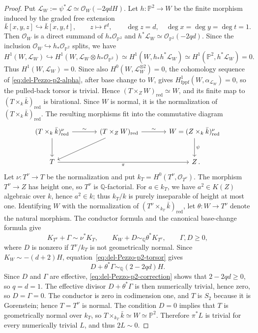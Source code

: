 \documentclass[10pt,abstract=true]{scrartcl}
\numberwithin{equation}{section}
\theoremstyle{definition}
\theoremstyle{remark}
\def\simQ{\sim_{\mathbb Q}} \def\geQ{\ge_{\mathbb Q}}
\begin{document}
\begin{proof}
  Put $\mathscr L_W:=\psi^*\mathscr L\simeq\mathcal O_W(-2qdH)$.
  Let $h\colon\mathbb P^2\to W$ be the finite morphism induced by the graded free extension
  \[
    \bar k[x,y,z]\hookrightarrow\bar k[x,y,t],\qquad
    z\longmapsto t^d,\qquad \deg z=d,\quad\deg x=\deg y=\deg t=1.
  \]
  Then $\mathcal O_W$ is a direct summand of $h_*\mathcal O_{\mathbb P^2}$ and $h^*\mathscr L_W\simeq\mathcal O_{\mathbb P^2}(-2qd)$.
  Since the inclusion $\mathcal O_W\hookrightarrow h_*\mathcal O_{\mathbb P^2}$ splits, we have
  \[
      H^1(W,\mathscr L_W) \hookrightarrow 
      H^1(W, \mathscr L_W \otimes h_*\mathcal O_{\mathbb P^2})
      \simeq
        H^1(W,h_*h^*\mathscr L_W)
        \simeq H^1(\mathbb P^2,h^*\mathscr L_W) = 0.
  \]
  Thus $H^1(W,\mathscr L_W) = 0$.
  Since also $H^0(W,\mathscr L_W^{\otimes2})=0$,
  the cohomology sequence of \eqref{eq:del-Pezzo-p2-alpha}, after base change to $W$, gives $H^1_{\mathrm{fppf}}(W,\alpha_{\mathscr L_W})=0$, so the pulled-back torsor is trivial.
  Hence $(T\times_ZW)_{\mathrm{red}}\simeq W$, and its finite map to $(T\times_k\bar k)_{\mathrm{red}}$ is birational.
  Since $W$ is normal, it is the normalization of $(T\times_k\bar k)_{\mathrm{red}}$.
  The resulting morphisms fit into the commutative diagram
  \[
    \begin{tikzcd}[column sep=large,row sep=large]
      (T\times_k\bar k)_{\mathrm{red}}^\nu \ar[r,"\sim"] \ar[d]
        & (T\times_ZW)_{\mathrm{red}} \ar[r,"\sim"] \ar[dl]
        & W=(Z\times_k\bar k)_{\mathrm{red}}^\nu \ar[d,"\psi"] \\
      T \ar[rr,"\pi"'] && Z\rlap{\,.}
    \end{tikzcd}
  \]
  Let $\nu\colon T^\nu\to T$ be the normalization and put $k_T=H^0(T^\nu,\mathcal O_{T^\nu})$.
  The morphism $T^\nu\to Z$ has height one, so $T^\nu$ is $\mathbb Q$-factorial.
  For $a\in k_T$, we have $a^2\in K(Z)$ algebraic over $k$, hence $a^2\in k$; thus $k_T/k$ is purely inseparable of height at most one.
  Identifying $W$ with the normalization of $(T^\nu\times_{k_T}\bar k)_{\mathrm{red}}$, let $\theta\colon W\to T^\nu$ denote the natural morphism.
  The conductor formula \cite[Lemma~2.14]{Patakfalvi-Waldron-2022} and the canonical base-change formula \cite[Theorem~3.16]{tanaka_invariants_2021} give
  \[
    K_{T^\nu}+\Gamma\sim\nu^*K_T,\qquad
    K_W+D\simQ\theta^*K_{T^\nu},\qquad \Gamma,D\ge0,
  \]
  where $D$ is nonzero if $T^\nu/k_T$ is not geometrically normal.
  Since $K_W\sim-(d+2)H$, equation~\eqref{eq:del-Pezzo-p2-torsor} gives
  \begin{equation}\label{eq:del-Pezzo-p2-correction}
    D+\theta^*\Gamma\simQ(2-2qd)H.
  \end{equation}
  Since $D$ and $\Gamma$ are effective, \eqref{eq:del-Pezzo-p2-correction} shows that $2-2qd\ge0$, so $q=d=1$.
  The effective divisor $D+\theta^*\Gamma$ is then numerically trivial, hence zero, so $D=\Gamma=0$.
  The conductor is zero in codimension one, and $T$ is $S_2$ because it is Gorenstein; hence $T=T^\nu$ is normal.
  The condition $D = 0$ implies that $T$ is geometrically normal over $k_T$, so $T\times_{k_T}\bar k\simeq W \simeq \mathbb P^2$.
  Therefore $\pi^*L$ is trivial for every numerically trivial $L$, and thus $2 L \sim 0$.


\end{proof}
\end{document}
